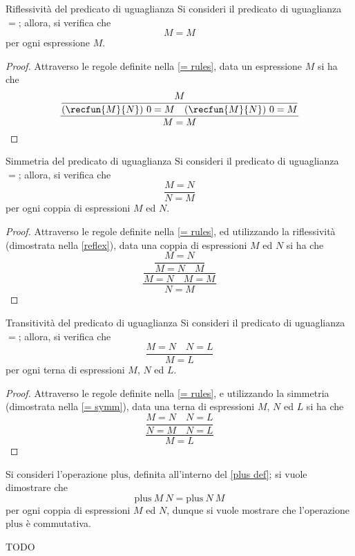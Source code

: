 \documentclass[a4paper, 12pt]{report}
\begin{document}
    \begin{framedprop}[label={reflex}]{Riflessività del predicato di uguaglianza}
        Si consideri il predicato di uguaglianza $=$; allora, si verifica che $$M = M$$ per ogni espressione $M$.
    \end{framedprop}

    \begin{proof}
        Attraverso le regole definite nella \cref{= rules}, data un espressione $M$ si ha che $$\dfrac{\dfrac{M}{(\recfun{M}{N}) \ 0 = M \quad (\recfun{M}{N}) \ 0 = M }}{M = M}$$
    \end{proof}

    \begin{framedprop}[label={= symm}]{Simmetria del predicato di uguaglianza}
        Si consideri il predicato di uguaglianza $=$; allora, si verifica che $$\dfrac{M = N}{N = M}$$ per ogni coppia di espressioni $M$ ed $N$.
    \end{framedprop}

    \begin{proof}
        Attraverso le regole definite nella \cref{= rules}, ed utilizzando la riflessività (dimostrata nella \cref{reflex}), data una coppia di espressioni $M$ ed $N$ si ha che $$\dfrac{\dfrac{\dfrac{M = N}{M = N \quad M}}{M = N \quad M = M}}{N = M}$$
    \end{proof}

    \begin{framedprop}[label={= trans}]{Transitività del predicato di uguaglianza}
        Si consideri il predicato di uguaglianza $=$; allora, si verifica che $$\dfrac{M = N \quad N = L}{M = L}$$ per ogni terna di espressioni $M$, $N$ ed $L$.
    \end{framedprop}

    \begin{proof}
        Attraverso le regole definite nella \cref{= rules}, e utilizzando la simmetria (dimostrata nella \cref{= symm}), data una terna di espressioni $M$, $N$ ed $L$ si ha che $$\dfrac{\dfrac{M = N \quad N = L}{N = M \quad N = L}}{M = L}$$
    \end{proof}

    \begin{example}
        Si consideri l'operazione $\mathrm{plus}$, definita all'interno del \cref{plus def}; si vuole dimostrare che $$\mathrm{plus} \ M \ N = \mathrm{plus} \ N \ M$$ per ogni coppia di espressioni $M$ ed $N$, dunque si vuole mostrare che l'operazione $\mathrm{plus}$ è commutativa.

        TODO
    \end{example}
\end{document}
